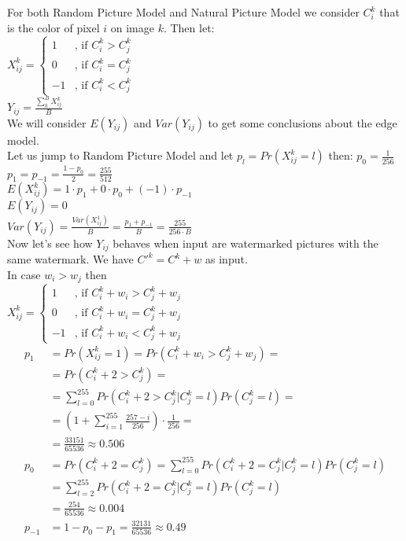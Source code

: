 \documentclass[varwidth]{standalone}
\begin{document}
For both Random Picture Model and Natural Picture Model we consider $C^k_i$ that
is the color of pixel $i$ on image $k$. Then let:\\
$X^k_{ij} =
\left\{
\begin{matrix}
1 & \text{, if } C^k_i > C^k_j\\
0 & \text{, if } C^k_i = C^k_j\\
-1 & \text{, if } C^k_i < C^k_j
\end{matrix}\right.$\\
$Y_{ij} = \frac{\sum^B_k X^k_{ij}}{B}$\\
We will consider $E(Y_{ij})$ and $Var(Y_{ij})$ to get some conclusions about
the edge model.\\
Let us jump to Random Picture Model and let $p_l = Pr(X^k_{ij} = l)$ then:
$p_0 = \frac{1}{256}$\\
$p_1 = p_{-1} = \frac{1-p_0}{2} = \frac{255}{512}$\\
$E(X^k_{ij}) = 1\cdot p_1 + 0\cdot p_0 + (-1)\cdot p_{-1}$\\
$E(Y_{ij}) = 0$\\
$Var(Y_{ij}) = \frac{Var(X^1_{ij})}{B} = \frac{p_1 + p_{-1}}{B} = \frac{255}{256\cdot B}$\\
Now let's see how $Y_{ij}$ behaves when input are watermarked pictures with
the same watermark. We have $C'^k = C^k + w$ as input.\\
In case $w_i > w_j$ then\\
$X^k_{ij} =
\left\{
\begin{matrix}
1 & \text{, if } C^k_i + w_i > C^k_j + w_j\\
0 & \text{, if } C^k_i + w_i = C^k_j + w_j\\
-1 & \text{, if } C^k_i + w_i < C^k_j + w_j
\end{matrix}\right.$\\
\begin{align*}
p_1 &= Pr(X^k_{ij} = 1) = Pr(C^k_i + w_i > C^k_j + w_j) =\\
    &= Pr(C^k_i + 2 > C^k_j) =\\
    &= \sum_{l=0}^{255} Pr(C^k_i + 2 > C^k_j | C^k_j = l)Pr(C^k_j = l) =\\
    &= (1 + \sum_{i=1}^{255} \frac{257-i}{256})\cdot \frac{1}{256} =\\
    &=\frac{33151}{65536}\approx 0.506\\
p_0 &= Pr(C^k_i + 2 = C^k_j) = \sum_{l=0}^{255} Pr(C^k_i + 2 = C^k_j | C^k_j = l)Pr(C^k_j = l)\\
    &= \sum_{l=2}^{255} Pr(C^k_i + 2 = C^k_j | C^k_j = l)Pr(C^k_j = l)\\
    &= \frac{254}{65536} \approx 0.004\\
p_{-1} &= 1 - p_0 - p_1 = \frac{32131}{65536} \approx 0.49
\end{align*}\\
\end{document}
